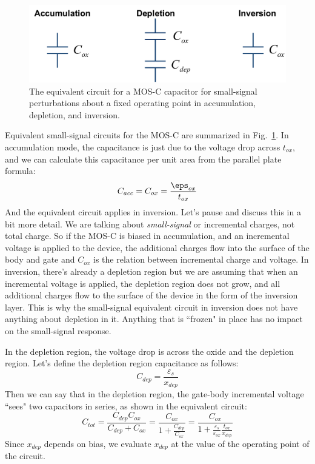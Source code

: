 \begin{figure}[tbh]
\begin{center}
\includegraphics[width=.85\columnwidth]{mos_cv_circuits}
\end{center}
\caption{The equivalent circuit for a MOS-C capacitor for small-signal perturbations about a fixed operating point in accumulation, depletion, and inversion. } \label{fig:mos_cv_circuits}
\end{figure}


Equivalent small-signal circuits for the MOS-C are summarized in Fig.~\ref{fig:mos_cv_circuits}.   In accumulation mode, the capacitance is just due to the voltage drop across $t_{ox}$, and we can calculate this capacitance per unit area from the parallel plate formula:
%
\begin{equation}
	C_{acc} = C_{ox} = \frac{\eps_{ox}}{t_{ox}}
\end{equation}
%
And the equivalent circuit applies in inversion.  Let's pause and discuss this in a bit more detail.  We are talking about \emph{small-signal} or incremental charges, not total charge.   So if the MOS-C is biased in accumulation, and an incremental voltage is applied to the device, the additional charges flow into the surface of the body and gate and $C_{ox}$ is the relation between incremental charge and voltage.  In inversion, there's already a depletion region but we are assuming that when an incremental voltage is applied, the depletion region does not grow, and all additional charges flow to the surface of the device in the form of the inversion layer. This is why the small-signal equivalent circuit in inversion does not have anything about depletion in it.  Anything that is ``frozen" in place has no impact on the small-signal response.

In the depletion region, the voltage drop is across the oxide and the depletion region.  Let's define the depletion region capacitance as follows:
%
\begin{equation}
	{C_{dep}} = \frac{{{\varepsilon _s}}}{{{x_{dep}}}}
\end{equation}
%
Then we can say that in the depletion region, the gate-body incremental voltage ``sees" two capacitors in series, as shown in the equivalent circuit:
%
\begin{equation}
{C_{tot}} = \frac{{{C_{dep}}{C_{ox}}}}{{{C_{dep}} + {C_{ox}}}} = \frac{{{C_{ox}}}}{{1 + \frac{{{C_{dep}}}}{{{C_{ox}}}}}} = \frac{{{C_{ox}}}}{{1 + \frac{{{\varepsilon _s}}}{{{\varepsilon _{ox}}}}\frac{{{t_{ox}}}}{{{x_{dep}}}}}}
\end{equation}
%
Since $x_{dep}$ depends on bias, we evaluate $x_{dep}$ at the value of the operating point of the circuit.  
%


